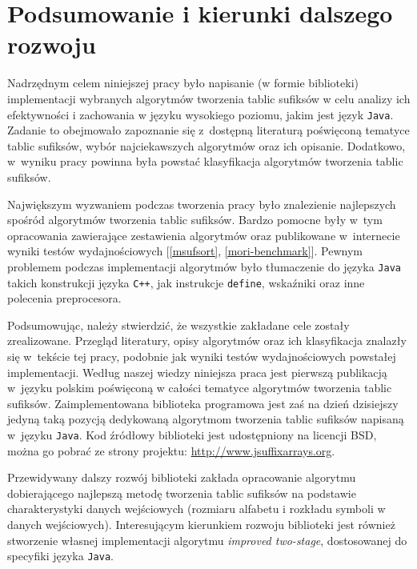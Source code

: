 \chapter{Podsumowanie i kierunki dalszego rozwoju}

Nadrzędnym celem niniejszej pracy było napisanie (w formie biblioteki) implementacji wybranych
algorytmów tworzenia tablic sufiksów w celu analizy ich efektywności i zachowania w języku wysokiego
poziomu, jakim jest język \texttt{Java}. Zadanie to obejmowało zapoznanie się z~dostępną literaturą
poświęconą tematyce tablic sufiksów, wybór najciekawszych algorytmów oraz ich opisanie. Dodatkowo,
w~wyniku pracy powinna była powstać klasyfikacja algorytmów tworzenia tablic sufiksów.

Największym wyzwaniem podczas tworzenia pracy było znalezienie najlepszych spośród algorytmów
tworzenia tablic sufiksów. Bardzo pomocne były w~tym opracowania zawierające zestawienia algorytmów
\cite{taxonomy, schurmann-phd} oraz publikowane w~internecie wyniki testów wydajnościowych
[\ref{msufsort}, \ref{mori-benchmark}]. Pewnym problemem podczas implementacji algorytmów było tłumaczenie
do języka \texttt{Java} takich konstrukcji języka \texttt{C++}, jak instrukcje \texttt{define},
wskaźniki oraz inne polecenia preprocesora.

Podsumowując, należy stwierdzić, że wszystkie zakładane cele zostały zrealizowane. Przegląd
literatury, opisy algorytmów oraz ich klasyfikacja znalazły się w~tekście tej pracy, podobnie jak
wyniki testów wydajnościowych powstałej implementacji. Według naszej wiedzy niniejsza praca jest
pierwszą publikacją w~języku polskim poświęconą w całości tematyce algorytmów tworzenia tablic
sufiksów. Zaimplementowana biblioteka programowa jest zaś na dzień dzisiejszy jedyną taką pozycją
dedykowaną algorytmom tworzenia tablic sufiksów napisaną w~języku \texttt{Java}. Kod źródłowy
biblioteki jest udostępniony na licencji BSD, można go pobrać ze strony projektu:
\url{http://www.jsuffixarrays.org}.

Przewidywany dalszy rozwój biblioteki zakłada opracowanie algorytmu dobierającego najlepszą metodę
tworzenia tablic sufiksów na podstawie charakterystyki danych wejściowych (rozmiaru alfabetu i
rozkładu symboli w danych wejściowych). Interesującym kierunkiem rozwoju biblioteki jest również
stworzenie własnej implementacji algorytmu \emph{improved two-stage}, dostosowanej do specyfiki
języka \texttt{Java}.
